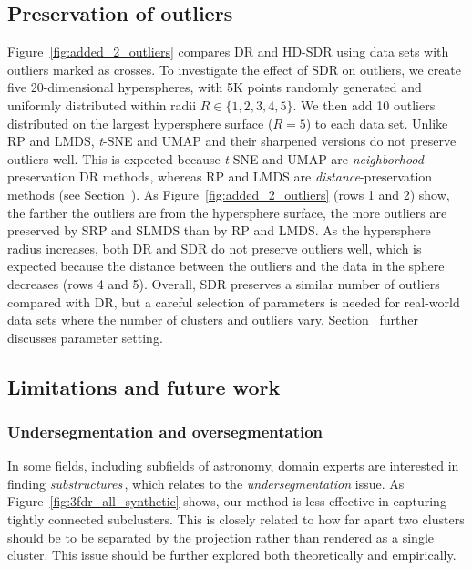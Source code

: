 \documentclass[sagev,Afour,times]{sagej}
\begin{document}
\subsection{Preservation of outliers}
\label{sec:outliers}
%
Figure~\ref{fig:added_2_outliers} compares DR and HD-SDR using data sets with outliers marked as crosses. To investigate the effect of SDR on outliers, we create five 20-dimensional hyperspheres, with 5$\mathrm{K}$ points randomly generated and uniformly distributed within radii $R \in \{1,2,3,4,5\}$. We then add 10 outliers distributed on the largest hypersphere surface ($R=5$) to each data set. Unlike RP and LMDS, \emph{t}-SNE and UMAP and their sharpened versions do not preserve outliers well. This is expected because \emph{t}-SNE and UMAP are \emph{neighborhood}-preservation DR methods, whereas RP and LMDS are \emph{distance}-preservation methods (see Section~). As Figure~\ref{fig:added_2_outliers} (rows 1 and 2) show, the farther the outliers are from the hypersphere surface, the more outliers are preserved by SRP and SLMDS than by RP and LMDS. As the hypersphere radius increases, both DR and SDR do not preserve outliers well, which is expected because the distance between the outliers and the data in the sphere decreases (rows 4 and 5). Overall, SDR preserves a similar number of outliers compared with DR, but a careful selection of parameters is needed for real-world data sets where the number of clusters and outliers vary. Section~ further discusses parameter setting.

\subsection{Limitations and future work}
\label{limitations}


\subsubsection{Undersegmentation and oversegmentation}
In some fields, including subfields of astronomy, domain experts are interested in finding \emph{substructures}\,\cite{astro:subclusters}, which relates to the \emph{undersegmentation} issue. As Figure~\ref{fig:3fdr_all_synthetic} shows, our method is less effective in capturing tightly connected subclusters. This is closely related to how far apart two clusters should be to be separated by the projection rather than rendered as a single cluster. This issue should be further explored both theoretically and empirically.
\end{document}
